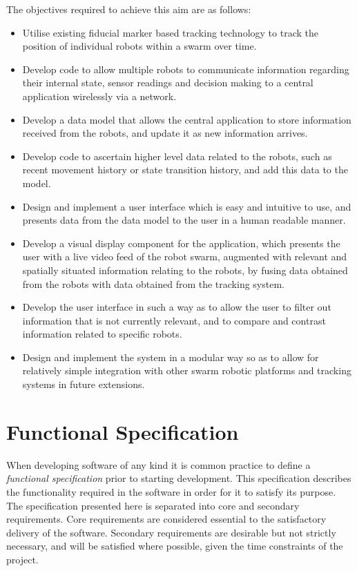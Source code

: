 \noindent The objectives required to achieve this aim are as follows:

\begin{itemize}
 \item Utilise existing fiducial marker based tracking technology to track the position of individual robots within a swarm over time.
 \item Develop code to allow multiple robots to communicate information regarding their internal state, sensor readings and decision making to a central application wirelessly via a network.
 \item Develop a data model that allows the central application to store information received from the robots, and update it as new information arrives.
 \item Develop code to ascertain higher level data related to the robots, such as recent movement history or state transition history, and add this data to the model.
 \item Design and implement a user interface which is easy and intuitive to use, and presents data from the data model to the user in a human readable manner.
 \item Develop a visual display component for the application, which presents the user with a live video feed of the robot swarm, augmented with relevant and spatially situated information relating to the robots, by fusing data obtained from the robots with data obtained from the tracking system.
 \item Develop the user interface in such a way as to allow the user to filter out information that is not currently relevant, and to compare and contrast information related to specific robots.
 \item Design and implement the system in a modular way so as to allow for relatively simple integration with other swarm robotic platforms and tracking systems in future extensions.
\end{itemize}


\section{Functional Specification} \label{FunctionalSpecification}
When developing software of any kind it is common practice to define a \textit{functional specification} prior to starting development. This specification describes the functionality required in the software in order for it to satisfy its purpose. The specification presented here is separated into core and secondary requirements. Core requirements are considered essential to the satisfactory delivery of the software. Secondary requirements are desirable but not strictly necessary, and will be satisfied where possible, given the time constraints of the project.

